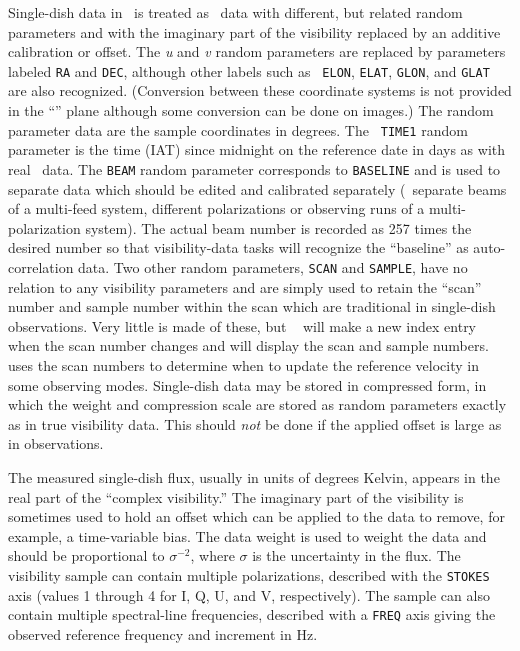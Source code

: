 
     Single-dish data in \AIPS\ is treated as \uv\ data with
different, but related random parameters and with the imaginary part
of the visibility replaced by an additive calibration or offset.  The
{\it u\/} and {\it v\/} random parameters are replaced by parameters
labeled {\tt RA} and {\tt DEC}, although other labels such as {\tt
ELON}, {\tt ELAT}, {\tt GLON}, and {\tt GLAT} are also recognized.
(Conversion between these coordinate systems is not provided in the
``\uv'' plane although some conversion can be done on images.)  The
random parameter data are the sample coordinates in degrees.  The {\tt
TIME1} random parameter is the time (IAT) since midnight on the
reference date in days as with real \uv\ data.  The {\tt BEAM} random
parameter corresponds to {\tt BASELINE} and is used to separate data
which should be edited and calibrated separately (\eg\ separate beams
of a multi-feed system, different polarizations or observing runs of a
multi-polarization system).  The actual beam number is recorded as 257
times the desired number so that visibility-data tasks will recognize
the ``baseline'' as auto-correlation data.  Two other random
parameters, {\tt SCAN} and {\tt SAMPLE}, have no relation to any
visibility parameters and are simply used to retain the ``scan''
number and sample number within the scan which are traditional in
single-dish observations.  Very little is made of these, but {\tt
{}} will make a new index entry when the scan number changes
and {\tt {}} will display the scan and sample numbers.  {\tt
{}} uses the scan numbers to determine when to update the
reference velocity in some observing modes.  Single-dish data may be
stored in compressed form, in which the weight and compression scale
are stored as random parameters exactly as in true visibility data.
This should {\it not\/} be done if the applied offset is large as in
 observations.

     The measured single-dish flux, usually in units of degrees
Kelvin, appears in the real part of the ``complex visibility.''  The
imaginary part of the visibility is sometimes used to hold an offset
which can be applied to the data to remove, for example, a
time-variable bias.  The data weight is used to weight the data and
should be proportional to $\sigma^{-2}$, where $\sigma$ is the
uncertainty in the flux.  The visibility sample can contain multiple
polarizations, described with the {\tt STOKES} axis (values 1 through
4 for I, Q, U, and V, respectively).  The sample can also contain
multiple spectral-line frequencies, described with a {\tt FREQ} axis
giving the observed reference frequency and increment in Hz.

